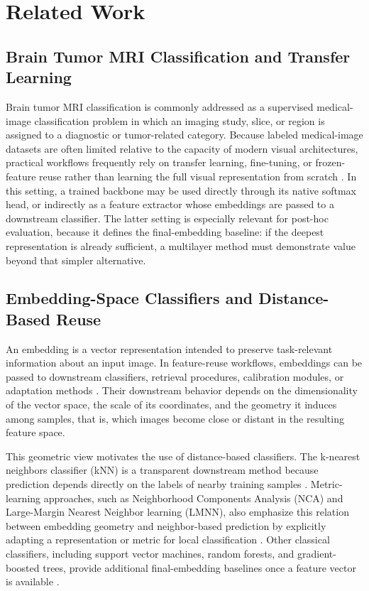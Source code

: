 \documentclass[main.tex]{subfiles}
\begin{document}
\section{Related Work}
\label{sec:related_work}

\subsection{Brain Tumor MRI Classification and Transfer Learning}

Brain tumor MRI classification is commonly addressed as a supervised medical-image classification problem in which an imaging study, slice, or region is assigned to a diagnostic or tumor-related category. Because labeled medical-image datasets are often limited relative to the capacity of modern visual architectures, practical workflows frequently rely on transfer learning, fine-tuning, or frozen-feature reuse rather than learning the full visual representation from scratch \cite{dorfner2025review,yosinski2014transferable,bar2024frofa}. In this setting, a trained backbone may be used directly through its native softmax head, or indirectly as a feature extractor whose embeddings are passed to a downstream classifier. The latter setting is especially relevant for post-hoc evaluation, because it defines the final-embedding baseline: if the deepest representation is already sufficient, a multilayer method must demonstrate value beyond that simpler alternative.

\subsection{Embedding-Space Classifiers and Distance-Based Reuse}

An embedding is a vector representation intended to preserve task-relevant information about an input image. In feature-reuse workflows, embeddings can be passed to downstream classifiers, retrieval procedures, calibration modules, or adaptation methods \cite{bar2024frofa,li2025embeddings}. Their downstream behavior depends on the dimensionality of the vector space, the scale of its coordinates, and the geometry it induces among samples, that is, which images become close or distant in the resulting feature space.

This geometric view motivates the use of distance-based classifiers. The k-nearest neighbors classifier (kNN) is a transparent downstream method because prediction depends directly on the labels of nearby training samples \cite{cover1967nearest}. Metric-learning approaches, such as Neighborhood Components Analysis (NCA) and Large-Margin Nearest Neighbor learning (LMNN), also emphasize this relation between embedding geometry and neighbor-based prediction by explicitly adapting a representation or metric for local classification \cite{goldberger2004nca,weinberger2009lmnn}. Other classical classifiers, including support vector machines, random forests, and gradient-boosted trees, provide additional final-embedding baselines once a feature vector is available \cite{cortes1995svm,breiman2001random,chen2016xgboost}.
\end{document}
